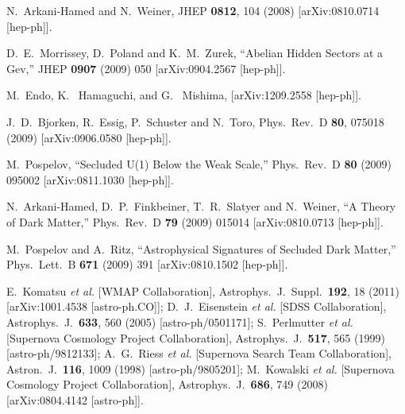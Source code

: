   N.~Arkani-Hamed and N.~Weiner,
  JHEP {\bf 0812}, 104 (2008)
  [arXiv:0810.0714 [hep-ph]].

D.~E.~Morrissey, D.~Poland and K.~M.~Zurek,
``Abelian Hidden Sectors at a Gev,''
JHEP {\bf 0907} (2009) 050
[arXiv:0904.2567 [hep-ph]].

M.~Endo, K.~ Hamaguchi, and G.~ Mishima, [arXiv:1209.2558 [hep-ph]]. 

  J.~D.~Bjorken, R.~Essig, P.~Schuster and N.~Toro,
  Phys.\ Rev.\ D {\bf 80}, 075018 (2009)
  [arXiv:0906.0580 [hep-ph]].

M.~Pospelov,
``Secluded U(1) Below the Weak Scale,''
Phys.\ Rev.\ D {\bf 80} (2009) 095002
[arXiv:0811.1030 [hep-ph]].

N.~Arkani-Hamed, D.~P.~Finkbeiner, T.~R.~Slatyer and N.~Weiner,
``A Theory of Dark Matter,''
Phys.\ Rev.\ D {\bf 79} (2009) 015014
[arXiv:0810.0713 [hep-ph]].

M.~Pospelov and A.~Ritz,
``Astrophysical Signatures of Secluded Dark Matter,''
Phys.\ Lett.\ B {\bf 671} (2009) 391
[arXiv:0810.1502 [hep-ph]].


  E.~Komatsu {\it et al.}  [WMAP Collaboration],
  Astrophys.\ J.\ Suppl.\  {\bf 192}, 18 (2011)
  [arXiv:1001.4538 [astro-ph.CO]];
  D.~J.~Eisenstein {\it et al.}  [SDSS Collaboration],
  Astrophys.\ J.\  {\bf 633}, 560 (2005)
  [astro-ph/0501171];
  S.~Perlmutter {\it et al.}  [Supernova Cosmology Project Collaboration],
  Astrophys.\ J.\  {\bf 517}, 565 (1999)
  [astro-ph/9812133];
  A.~G.~Riess {\it et al.}  [Supernova Search Team Collaboration],
  Astron.\ J.\  {\bf 116}, 1009 (1998)
  [astro-ph/9805201];
  M.~Kowalski {\it et al.}  [Supernova Cosmology Project Collaboration],
  Astrophys.\ J.\  {\bf 686}, 749 (2008)
  [arXiv:0804.4142 [astro-ph]].


